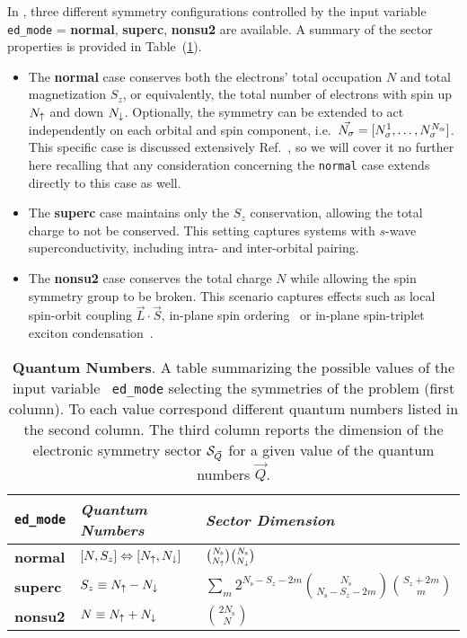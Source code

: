 \documentclass[edipack_sp.tex]{subfiles}
\begin{document}
In \NAME, three different symmetry configurations 
controlled by the input variable {\tt ed\_mode} = {\bf normal}, 
{\bf superc}, {\bf nonsu2} are available. A summary of the sector properties is provided in
Table~(\ref{TabSector}). 

\begin{itemize}
\item{} The {\bf normal} case conserves both the electrons' total occupation $N$
and total magnetization $S_z$, or equivalently, the total number
of electrons with spin up $N_\uparrow$ and down $N_\downarrow$.
Optionally, the symmetry
can be extended to act independently on each orbital and spin
component, i.e.~$\vec{N_\sigma}=[N^1_\sigma,\dots,N^{N_\alpha}_\sigma]$. This
specific case is discussed extensively
Ref.~\cite{Amaricci2022CPC}, so we will cover it no further here recalling that any consideration concerning the {\tt normal} case extends directly to this case as well.

%

\item{} The {\bf superc} case maintains only the $S_z$ conservation,
allowing the total charge to not be conserved. This setting captures
systems with $s$-wave superconductivity, including 
intra- and inter-orbital pairing.

\item{} The {\bf nonsu2} case conserves the total
charge $N$ while allowing the spin symmetry group to be broken.
This scenario captures effects such as local spin-orbit coupling
$\vec{L}\cdot\vec{S}$, in-plane spin ordering~\cite{BellomiaKMH} or
in-plane spin-triplet exciton condensation~\cite{Amaricci2023_excitons,Blason}.  
\end{itemize}


\begin{table}%
\begin{tabularx}{\linewidth}{ |X|X|X| }
 \hline
  {\tt ed\_mode} & {\it Quantum Numbers} & {\it Sector Dimension} \\
  \hline
  {\bf normal} & $[N,S_z]\Leftrightarrow[N_\uparrow,N_\downarrow]$ &
                                                $\binom{N_\mathrm{s}}{N_\uparrow}\binom{N_\mathrm{s}}{N_\downarrow}$
  \\
  \hline
  {\bf superc} & $S_z\equiv N_\uparrow-N_\downarrow$ &  $\sum_m 2^{N_\mathrm{s}-S_z-2m}\binom{N_\mathrm{s}}{N_\mathrm{s}-S_z-2m}\binom{S_z+2m}{m}$
  \\
  \hline
  {\bf nonsu2} & $N \equiv N_\uparrow+N_\downarrow$ & $\binom{2N_\mathrm{s}}{N}$ \\ 
 \hline  
\end{tabularx}
\vspace{2mm}
\caption{\label{TabSector}
  {\bf Quantum Numbers}.
A table summarizing the possible values of the input variable {\tt
  ed\_mode} selecting the symmetries of the problem (first column). To each value
correspond different quantum numbers listed in the second column.
The third column reports the dimension of the electronic symmetry sector ${\cal S}_{\vec{Q}}$ for a
given value of the quantum numbers $\vec{Q}$.}
\end{table}
\end{document}
